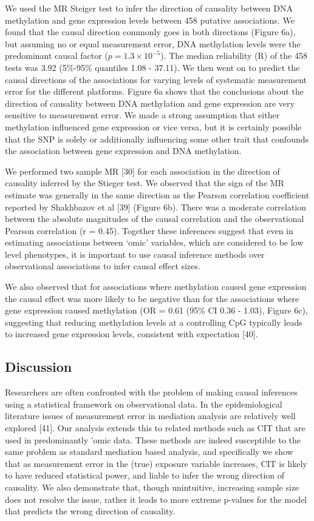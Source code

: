 \documentclass[]{article}
\begin{document}
We used the MR Steiger test to infer the direction of causality between
DNA methylation and gene expression levels between 458 putative
associations. We found that the causal direction commonly goes in both
directions (Figure 6a), but assuming no or equal measurement error, DNA
methylation levels were the predominant causal factor
(\(p = 1.3\times 10^{-5}\)). The median reliability (R) of the 458 tests
was 3.92 (5\%-95\% quantiles 1.08 - 37.11). We then went on to predict
the causal directions of the associations for varying levels of
systematic measurement error for the different platforms. Figure 6a
shows that the conclusions about the direction of causality between DNA
methylation and gene expression are very sensitive to measurement error.
We made a strong assumption that either methylation influenced gene
expression or vice versa, but it is certainly possible that the SNP is
solely or additionally influencing some other trait that confounds the
association between gene expression and DNA methylation.

We performed two sample MR {[}30{]} for each association in the
direction of causality inferred by the Stieger test. We observed that
the sign of the MR estimate was generally in the same direction as the
Pearson correlation coefficient reported by Shakhbazov et al {[}39{]}
(Figure 6b). There was a moderate correlation between the absolute
magnitudes of the causal correlation and the observational Pearson
correlation (r = 0.45). Together these inferences suggest that even in
estimating associations between `omic' variables, which are considered
to be low level phenotypes, it is important to use causal inference
methods over observational associations to infer causal effect sizes.

We also observed that for associations where methylation caused gene
expression the causal effect was more likely to be negative than for the
associations where gene expression caused methylation (OR = 0.61 (95\%
CI 0.36 - 1.03), Figure 6c), suggesting that reducing methylation levels
at a controlling CpG typically leads to increased gene expression
levels, consistent with expectation {[}40{]}.

\hypertarget{discussion}{%
\subsection{Discussion}\label{discussion}}

Researchers are often confronted with the problem of making causal
inferences using a statistical framework on observational data. In the
epidemiological literature issues of measurement error in mediation
analysis are relatively well explored {[}41{]}. Our analysis extends
this to related methods such as CIT that are used in predominantly 'omic
data. These methods are indeed susceptible to the same problem as
standard mediation based analysis, and specifically we show that as
measurement error in the (true) exposure variable increases, CIT is
likely to have reduced statistical power, and liable to infer the wrong
direction of causality. We also demonstrate that, though unintuitive,
increasing sample size does not resolve the issue, rather it leads to
more extreme p-values for the model that predicts the wrong direction of
causality.
\end{document}
